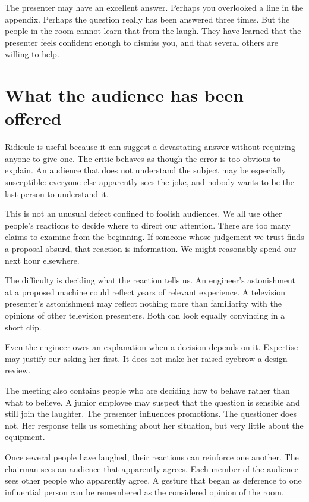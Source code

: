 \documentclass[12pt,a4paper]{book}
\begin{document}
The presenter may have an excellent answer. Perhaps you overlooked a line in the appendix. Perhaps the question really has been answered three times. But the people in the room cannot learn that from the laugh. They have learned that the presenter feels confident enough to dismiss you, and that several others are willing to help.

\section*{What the audience has been offered}

Ridicule is useful because it can suggest a devastating answer without requiring anyone to give one. The critic behaves as though the error is too obvious to explain. An audience that does not understand the subject may be especially susceptible: everyone else apparently sees the joke, and nobody wants to be the last person to understand it.

This is not an unusual defect confined to foolish audiences. We all use other people's reactions to decide where to direct our attention. There are too many claims to examine from the beginning. If someone whose judgement we trust finds a proposal absurd, that reaction is information. We might reasonably spend our next hour elsewhere.

The difficulty is deciding what the reaction tells us. An engineer's astonishment at a proposed machine could reflect years of relevant experience. A television presenter's astonishment may reflect nothing more than familiarity with the opinions of other television presenters. Both can look equally convincing in a short clip.

Even the engineer owes an explanation when a decision depends on it. Expertise may justify our asking her first. It does not make her raised eyebrow a design review.

The meeting also contains people who are deciding how to behave rather than what to believe. A junior employee may suspect that the question is sensible and still join the laughter. The presenter influences promotions. The questioner does not. Her response tells us something about her situation, but very little about the equipment.

Once several people have laughed, their reactions can reinforce one another. The chairman sees an audience that apparently agrees. Each member of the audience sees other people who apparently agree. A gesture that began as deference to one influential person can be remembered as the considered opinion of the room.
\end{document}

